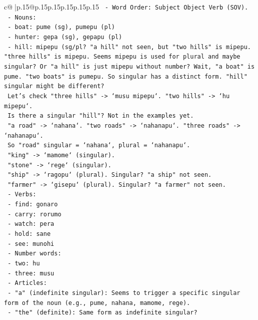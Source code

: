 \documentclass{article}
\begin{document}
{\begin{supertabular}{c@{$\;$}|p{.15\linewidth}@{}p{.15\linewidth}p{.15\linewidth}p{.15\linewidth}p{.15\linewidth}p{.15\linewidth}}
{{{\texttt{     {-} Word Order: Subject Object Verb (SOV).} \\
\texttt{     {-} Nouns:} \\
\texttt{       {-} boat: pume (sg), pumepu (pl)} \\
\texttt{       {-} hunter: gepa (sg), gepapu (pl)} \\
\texttt{       {-} hill: mipepu (sg/pl? "a hill" not seen, but "two hills" is mipepu. "three hills" is mipepu. Seems mipepu is used for plural and maybe singular? Or "a hill" is just mipepu without number? Wait, "a boat" is pume. "two boats" is pumepu. So singular has a distinct form. "hill" singular might be different?} \\
\texttt{         Let's check "three hills" {-}> `musu mipepu`. "two hills" {-}> `hu mipepu`.} \\
\texttt{         Is there a singular "hill"? Not in the examples yet.} \\
\texttt{         "a road" {-}> `nahana`. "two roads" {-}> `nahanapu`. "three roads" {-}> `nahanapu`.} \\
\texttt{         So "road" singular = `nahana`, plural = `nahanapu`.} \\
\texttt{         "king" {-}> `mamome` (singular).} \\
\texttt{         "stone" {-}> `rege` (singular).} \\
\texttt{         "ship" {-}> `ragopu` (plural). Singular? "a ship" not seen.} \\
\texttt{         "farmer" {-}> `gisepu` (plural). Singular? "a farmer" not seen.} \\
\texttt{     {-} Verbs:} \\
\texttt{       {-} find: gonaro} \\
\texttt{       {-} carry: rorumo} \\
\texttt{       {-} watch: pera} \\
\texttt{       {-} hold: sane} \\
\texttt{       {-} see: munohi} \\
\texttt{     {-} Number words:} \\
\texttt{       {-} two: hu} \\
\texttt{       {-} three: musu} \\
\texttt{     {-} Articles:} \\
\texttt{       {-} "a" (indefinite singular): Seems to trigger a specific singular form of the noun (e.g., pume, nahana, mamome, rege).} \\
\texttt{       {-} "the" (definite): Same form as indefinite singular?} \\
}}}
\end{supertabular}}
\end{document}
